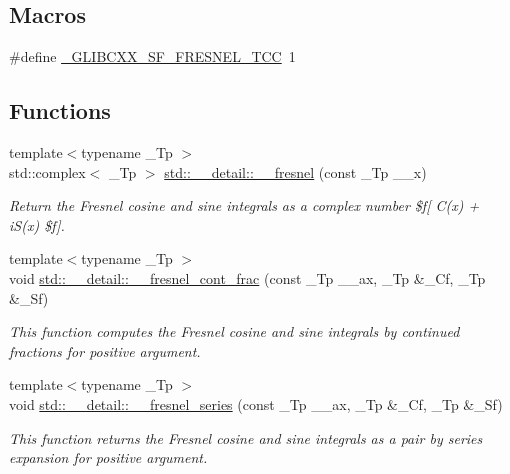 \subsection*{Macros}
\begin{DoxyCompactItemize}
\item 
\#define \hyperlink{sf__fresnel_8tcc_a157a41147fba868fe64f89d64525188e}{\+\_\+\+G\+L\+I\+B\+C\+X\+X\+\_\+\+S\+F\+\_\+\+F\+R\+E\+S\+N\+E\+L\+\_\+\+T\+C\+C}~1
\end{DoxyCompactItemize}
\subsection*{Functions}
\begin{DoxyCompactItemize}
\item 
{\footnotesize template$<$typename \+\_\+\+Tp $>$ }\\std\+::complex$<$ \+\_\+\+Tp $>$ \hyperlink{namespacestd_1_1____detail_a322045015cfbde5a45e7718d533de60d}{std\+::\+\_\+\+\_\+detail\+::\+\_\+\+\_\+fresnel} (const \+\_\+\+Tp \+\_\+\+\_\+x)
\begin{DoxyCompactList}\small\item\em Return the Fresnel cosine and sine integrals as a complex number \$f\mbox{[} C(x) + i\+S(x) \$f\mbox{]}. \end{DoxyCompactList}\item 
{\footnotesize template$<$typename \+\_\+\+Tp $>$ }\\void \hyperlink{namespacestd_1_1____detail_aeae8420e2fa1671f004066525adc99b6}{std\+::\+\_\+\+\_\+detail\+::\+\_\+\+\_\+fresnel\+\_\+cont\+\_\+frac} (const \+\_\+\+Tp \+\_\+\+\_\+ax, \+\_\+\+Tp \&\+\_\+\+Cf, \+\_\+\+Tp \&\+\_\+\+Sf)
\begin{DoxyCompactList}\small\item\em This function computes the Fresnel cosine and sine integrals by continued fractions for positive argument. \end{DoxyCompactList}\item 
{\footnotesize template$<$typename \+\_\+\+Tp $>$ }\\void \hyperlink{namespacestd_1_1____detail_aae7775bc46d621e54fb9d994c2f35e2a}{std\+::\+\_\+\+\_\+detail\+::\+\_\+\+\_\+fresnel\+\_\+series} (const \+\_\+\+Tp \+\_\+\+\_\+ax, \+\_\+\+Tp \&\+\_\+\+Cf, \+\_\+\+Tp \&\+\_\+\+Sf)
\begin{DoxyCompactList}\small\item\em This function returns the Fresnel cosine and sine integrals as a pair by series expansion for positive argument. \end{DoxyCompactList}\end{DoxyCompactItemize}


